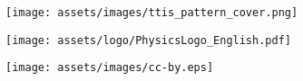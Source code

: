 \begin{titlepage}
\begin{figure}[H]
    \centering
    \texttt{[image: assets/images/ttis\_pattern\_cover.png]}
    \label{fig:cover_photo}
\end{figure}
\vspace{-10pt}

\vspace*{\fill}
\begin{minipage}[t]{0.5\textwidth}
\begin{figure}[H]
    \texttt{[image: assets/logo/PhysicsLogo\_English.pdf]}
\end{figure}
\end{minipage}
\begin{minipage}[t]{0.49\textwidth}
\begin{figure}[H]
    \texttt{[image: assets/images/cc-by.eps]}
\end{figure}
\end{minipage}

\end{titlepage}

